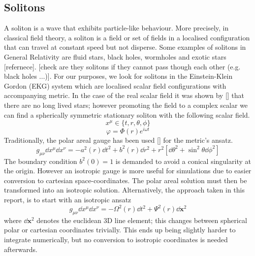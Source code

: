 \subsection{Solitons}
A soliton is a wave that exhibits particle-like behaviour. More precisely, in classical field theory, a soliton is a field or set of fields in a localised configuration that can travel at constant speed but not disperse. Some examples of solitons in General Relativity are fluid stars, black holes, wormholes and exotic stars [refernece]. [check are they solitons if they cannot pass though each other (e.g. black holes ...)]. For our purposes, we look for solitons in the Einstein-Klein Gordon (EKG) system which are localised scalar field configurations with accompanying metric. In the case of the real scalar field it was shown by [] that there are no long lived stars; however promoting the field to a complex scalar we can find a spherically symmetric stationary soliton with the following scalar field.
$$ x^\mu \in \{t,r,\theta,\phi \}$$
\begin{equation} \varphi = \Phi(r)e^{i\omega t} \end{equation}
Traditionally, the polar areal gauge has been used [] for the metric's ansatz.
\[g_{\mu\nu}\dd x^\mu \dd x^\nu =- a^2(r)\dd t^2 + b^2(r) \dd r^2 + r^2 \left[ \dd \theta^2 + \sin^2\theta \dd \phi^2\right]\]
The boundary condition $b^2(0)=1$ is demanded to avoid a conical singularity at the origin. However an isotropic gauge is more useful for simulations due to easier conversion to cartesian space-coordinates. The polar areal solution must then be transformed into an isotropic solution. Alternatively, the approach taken in this report, is to start with an isotropic ansatz
\[ g_{\mu\nu}\dd x^\mu \dd x^\nu =- \Omega^2(r)\dd t^2 + \Psi^2(r)\dd \bm{x}^2\]
where $\dd \bm{x}^2$ denotes the euclidean 3D line element; this changes between spherical polar or cartesian coordinates trivially. This ends up being slightly harder to integrate numerically, but no conversion to isotropic coordinates is needed afterwards.

